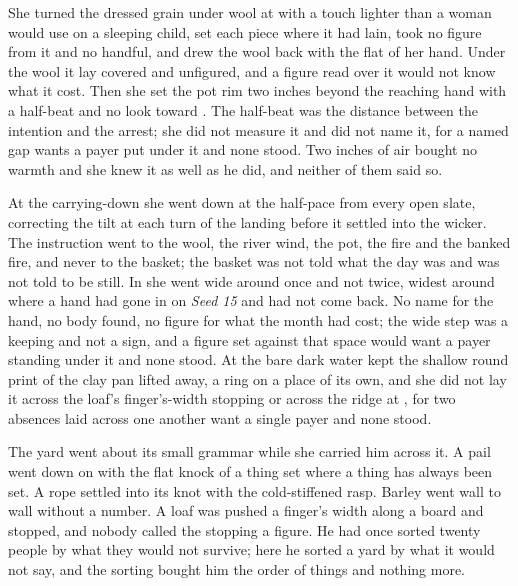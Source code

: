 She turned the dressed grain under wool at  with a touch lighter than a woman would use on a sleeping child, set each piece where it had lain, took no figure from it and no handful, and drew the wool back with the flat of her hand. Under the wool it lay covered and unfigured, and a figure read over it would not know what it cost. Then she set the pot rim two inches beyond the reaching hand with a half-beat and no look toward . The half-beat was the distance between the intention and the arrest; she did not measure it and did not name it, for a named gap wants a payer put under it and none stood. Two inches of air bought no warmth and she knew it as well as he did, and neither of them said so.

At the carrying-down she went down  at the half-pace from every open slate, correcting the tilt at each turn of the landing before it settled into the wicker. The instruction went to the wool, the river wind, the pot, the fire and the banked fire, and never to the basket; the basket was not told what the day was and was not told to be still. In  she went wide around  once and not twice, widest around  where a hand had gone in on \emph{Seed 15} and had not come back. No name for the hand, no body found, no figure for what the month had cost; the wide step was a keeping and not a sign, and a figure set against that space would want a payer standing under it and none stood. At  the bare dark water kept the shallow round print of the clay pan lifted away, a ring on a place of its own, and she did not lay it across the loaf's finger's-width stopping or across the ridge at , for two absences laid across one another want a single payer and none stood.

The yard went about its small grammar while she carried him across it. A pail went down on  with the flat knock of a thing set where a thing has always been set. A rope settled into its knot with the cold-stiffened rasp. Barley went wall to wall without a number. A loaf was pushed a finger's width along a board and stopped, and nobody called the stopping a figure. He had once sorted twenty people by what they would not survive; here he sorted a yard by what it would not say, and the sorting bought him the order of things and nothing more.


